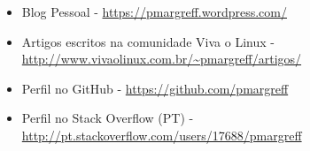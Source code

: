 \documentclass[11pt,a4paper,sans]{moderncv}        %
\begin{document}
\vspace{6pt}
 
\begin{itemize}

\item{Blog Pessoal - \href{https://pmargreff.wordpress.com/}{https://pmargreff.wordpress.com/}}

\item{Artigos escritos na comunidade Viva o Linux  - \href{http://www.vivaolinux.com.br/~pmargreff/artigos/}{http://www.vivaolinux.com.br/\~{}pmargreff/artigos/}}

\item{Perfil no GitHub - \href{https://github.com/pmargreff}{https://github.com/pmargreff}}

\item{Perfil no Stack Overflow (PT) - \href{http://pt.stackoverflow.com/users/17688/pmargreff}{http://pt.stackoverflow.com/users/17688/pmargreff}}

\end{itemize}


\nocite{*}



\end{document}
